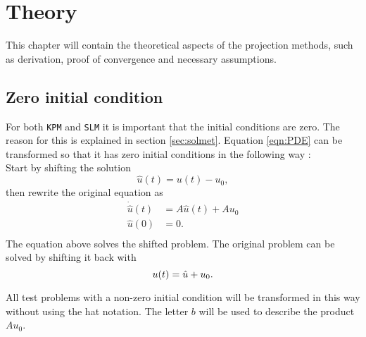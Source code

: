 \chapter{Theory}
This chapter will contain the theoretical aspects of the projection methods, such as derivation, proof of convergence and necessary assumptions. 
 
\section{Zero initial condition}%
\label{sec:inittransf}
For both \texttt{KPM} and \texttt{SLM} it is important that the initial conditions are zero. The reason for this is explained in section \ref{sec:solmet}. Equation \eqref{eqn:PDE} can be transformed so that it has zero initial conditions in the following way \cite{zerotransf}: \\
Start by shifting the solution
\begin{equation*}
\hat{u}(t) = u(t)-u_0,
\end{equation*}
then rewrite the original equation as
\begin{equation}
\begin{aligned}
\dot{\hat{u}}(t) &= A \hat{u}(t) +A u_0\\
 \hat{u}(0)&= 0. \\
\end{aligned}
\label{eqn:shiftedproblem}
\end{equation}
\noindent The equation above solves the shifted problem. The original problem can be solved by shifting it back with
\begin{equation*}
 u(t) = \hat{u} + u_0. \\
\end{equation*}


\noindent All test problems with a non-zero initial condition will be transformed in this way without using the hat notation. The letter $b$ will be used to describe the product $A u_0$.

